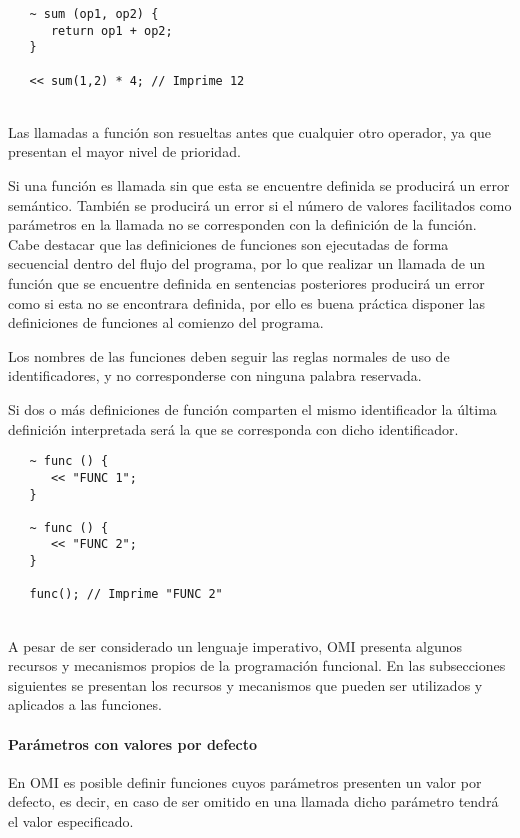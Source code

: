\begin{lstlisting}
   ~ sum (op1, op2) { 
      return op1 + op2;
   }
   
   << sum(1,2) * 4; // Imprime 12
\end{lstlisting}
\hfill\\ 

Las llamadas a función son resueltas antes que cualquier otro operador, ya que presentan el mayor nivel de prioridad. 

Si una función es llamada sin que esta se encuentre definida se producirá un error semántico. También se producirá 
un error si el número de valores facilitados como parámetros en la llamada no se corresponden con la definición de la función. Cabe destacar 
que las definiciones de funciones son ejecutadas de forma secuencial dentro del flujo del programa, por lo que realizar 
un llamada de un función que se encuentre definida en sentencias posteriores producirá un error como si esta no
se encontrara definida, por ello es buena práctica disponer las definiciones de funciones al comienzo del programa.

Los nombres de las funciones deben seguir las reglas normales de uso de identificadores, y no corresponderse con ninguna
palabra reservada.

Si dos o más definiciones de función comparten el mismo identificador la última definición interpretada será la que se corresponda
con dicho identificador. \\

\begin{lstlisting}
   ~ func () { 
      << "FUNC 1";
   }
   
   ~ func () { 
      << "FUNC 2";
   }
   
   func(); // Imprime "FUNC 2"
\end{lstlisting} 
\hfill\\ 

A pesar de ser considerado un lenguaje imperativo, OMI presenta algunos recursos y mecanismos propios de la programación funcional. En las 
subsecciones siguientes se presentan los recursos y mecanismos que pueden ser utilizados y aplicados a las funciones. 

\paragraph{Parámetros con valores por defecto}
En OMI es posible definir funciones cuyos parámetros presenten un valor por defecto, es decir, en caso de ser omitido en una llamada
dicho parámetro tendrá el valor especificado. 

